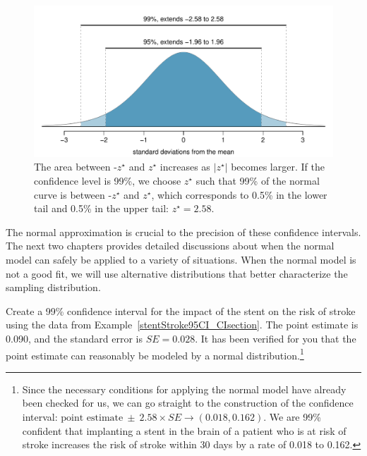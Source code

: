 \begin{figure}[ht]
\centering
\includegraphics[width=\textwidth]{02/figures/choosingZForCI/choosingZForCI}
\caption{The area between -$z^{\star}$ and $z^{\star}$ increases as $|z^{\star}|$ becomes larger. If the confidence level is 99\%, we choose $z^{\star}$ such that 99\% of the normal curve is between -$z^{\star}$ and $z^{\star}$, which corresponds to 0.5\% in the lower tail and 0.5\% in the upper tail: $z^{\star}=2.58$.}
\label{choosingZForCI}
\end{figure}

The normal approximation is crucial to the precision of these confidence intervals. The next two chapters provides detailed discussions about when the normal model can safely be applied to a variety of situations. When the normal model is not a good fit, we will use alternative distributions that better characterize the sampling distribution.


\begin{exercise} \label{find99CIForRun10AgeExercise}
Create a 99\% confidence interval for the impact of the stent on the risk of stroke using the data from Example~\ref{stentStroke95CI_CIsection}. The point estimate is 0.090, and the standard error is $SE = 0.028$. It has been verified for you that the point estimate can reasonably be modeled by a normal distribution.\footnote{Since the necessary conditions for applying the normal model have already been checked for us, we can go straight to the construction of the confidence interval: $\text{point estimate}\ \pm\ 2.58 \times  SE \rightarrow (0.018, 0.162)$. We are 99\% confident that implanting a stent in the brain of a patient who is at risk of stroke increases the risk of stroke within 30 days by a rate of 0.018 to 0.162.}
\end{exercise}

